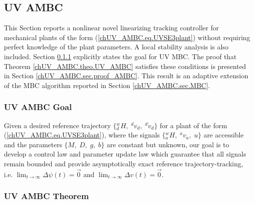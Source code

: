 \subsection{\acs{UV} \acs{AMBC}}
\label{chUV_AMBC.sec.AMBC}

This Section reports a nonlinear novel linearizing tracking controller
for mechanical plants of the form (\ref{chUV_AMBC.eq.UVSE3plant})
without requiring perfect knowledge of the plant parameters.  
%
A local stability analysis is also included. 
%
Section \ref{chUV_AMBC.sec.AMBC_goal} explicitly states the goal for
\ac{UV} \ac{MBC}.
%
The proof that Theorem \ref{chUV_AMBC.theo.UV_AMBC} satisfies these
conditions is presented in Section \ref{chUV_AMBC.sec.proof_AMBC}.
%
This result is an adaptive extension of the \ac{MBC} algorithm
reported in Section \ref{chUV_AMBC.sec.MBC}.


\subsubsection{\acs{UV} \acs{AMBC} Goal}
\label{chUV_AMBC.sec.AMBC_goal}

Given a desired reference trajectory
$\{{^w_d}H,\;{^d}v_d,\;{^d}\dot{v}_d \}$ for a plant of the form
(\ref{chUV_AMBC.eq.UVSE3plant}), where the signals
$\{{^w_a}H,\;{^a}v_a,\; u\}$ are accessible and the parameters
$\{M,\;D,\; g,\; b\}$ are constant but unknown, our goal is to develop
a control law
{} and parameter update law
which guarantee that all signals remain bounded and provide
asymptotically exact reference trajectory-tracking, i.e.  $\lim_{t\to
  \infty}\Delta \psi(t)=\vec{0}$ and $\lim_{t\to \infty}\Delta
v(t)=\vec{0}$.

\subsubsection{\acs{UV} \acs{AMBC} Theorem}

